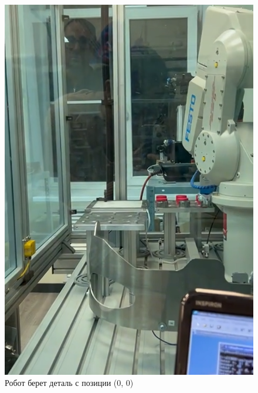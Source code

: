 \documentclass[a4paper, 12pt]{article}
\begin{document}
    \begin{figure}[H]
        \centering
        \includegraphics[scale=1]{take00.png}
        \captionsetup{skip=0pt}
        \caption{Робот берет деталь с позиции (0, 0)}
        \label{fig:take00}
    \end{figure}
\end{document}
